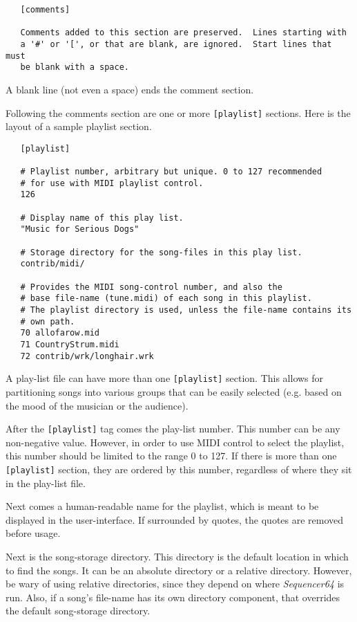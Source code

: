    \begin{verbatim}
   [comments]

   Comments added to this section are preserved.  Lines starting with
   a '#' or '[', or that are blank, are ignored.  Start lines that must
   be blank with a space.
   \end{verbatim}

   A blank line (not even a space) ends the comment section.

   Following the comments section are one or more \texttt{[playlist]} sections.
   Here is the layout of a sample playlist section.

   \begin{verbatim}
   [playlist]

   # Playlist number, arbitrary but unique. 0 to 127 recommended
   # for use with MIDI playlist control.
   126

   # Display name of this play list.
   "Music for Serious Dogs"

   # Storage directory for the song-files in this play list.
   contrib/midi/

   # Provides the MIDI song-control number, and also the
   # base file-name (tune.midi) of each song in this playlist.
   # The playlist directory is used, unless the file-name contains its
   # own path.
   70 allofarow.mid
   71 CountryStrum.midi
   72 contrib/wrk/longhair.wrk
   \end{verbatim}

   A play-list file can have more than one \texttt{[playlist]} section.  This
   allows for partitioning songs into various groups that can be easily
   selected (e.g. based on the mood of the musician or the audience).

   After the \texttt{[playlist]} tag comes the play-list number.
   This number can be any non-negative value.
   However, in order to use MIDI control to select the playlist, this number
   should be limited to the range 0 to 127.
   If there is more than one \texttt{[playlist]} section, they are ordered by
   this number, regardless of where they sit in the play-list file.

   Next comes a human-readable name for the playlist, which is meant to be
   displayed in the user-interface.  If surrounded by quotes, the quotes are
   removed before usage.

   Next is the song-storage directory.
   This directory is the default location in which to find the songs.
   It can be an absolute directory or a relative directory.
   However, be wary of using relative directories, since they depend on where
   \textsl{Sequencer64} is run.
   Also, if a song's file-name  has its own directory component, that overrides
   the default song-storage directory.

